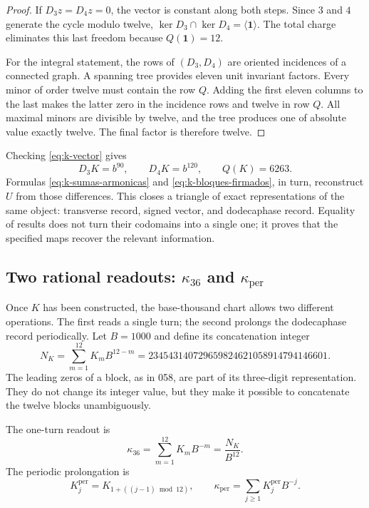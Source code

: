 \begin{proof}
If \(D_3z=D_4z=0\), the vector is constant along both steps.
Since \(3\) and \(4\) generate the cycle modulo twelve,
\(\ker D_3\cap\ker D_4=\langle\mathbf1\rangle\). The total charge
eliminates this last freedom because \(Q(\mathbf1)=12\).

For the integral statement, the rows of \((D_3,D_4)\) are oriented incidences
of a connected graph. A spanning tree provides eleven
unit invariant factors. Every minor of order twelve must contain the
row \(Q\). Adding the first eleven columns to the last makes the latter
zero in the incidence rows and twelve in row \(Q\). All
maximal minors are divisible by twelve, and the tree produces one
of absolute value exactly twelve. The final factor is therefore twelve.
\end{proof}

Checking \eqref{eq:k-vector} gives
\[
 D_3K=b^{90},\qquad D_4K=b^{120},\qquad Q(K)=6263.
\]
Formulas \eqref{eq:k-sumas-armonicas} and
\eqref{eq:k-bloques-firmados}, in turn, reconstruct \(U\) from those
differences. This closes a triangle of exact representations of the
same object: transverse record, signed vector, and dodecaphase record. Equality
of results does not turn their codomains into a single one; it proves that
the specified maps recover the relevant information.

\subsection{Two rational readouts: \texorpdfstring{\(\kappa_{36}\)}{kappa36} and \texorpdfstring{\(\kappa_{\mathrm{per}}\)}{periodic kappa}}
\label{subsec:k-kappas}

Once \(K\) has been constructed, the base-thousand chart allows two different
operations. The first reads a single turn; the second prolongs the dodecaphase record
periodically. Let \(B=1000\) and define its concatenation integer
\begin{equation}
 N_K=\sum_{m=1}^{12}K_mB^{12-m}
 =234543140729659824621058914794146601.
 \label{eq:k-numerador}
\end{equation}
The leading zeros of a block, as in 058, are part of its three-digit
representation. They do not change its integer value, but they make it possible to concatenate
the twelve blocks unambiguously.

\begin{definition}
\label{def:k-kappas}
The one-turn readout is
\[
 \kappa_{36}=\sum_{m=1}^{12}K_mB^{-m}=\frac{N_K}{B^{12}}.
\]
The periodic prolongation is
\[
 K_j^{\mathrm{per}}=K_{1+((j-1)\bmod12)},\qquad
 \kappa_{\mathrm{per}}=\sum_{j\geq1}K_j^{\mathrm{per}}B^{-j}.
\]
\end{definition}

